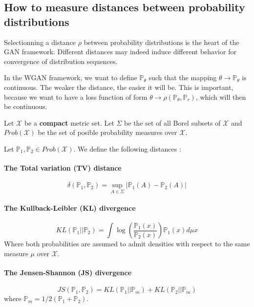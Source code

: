 \documentclass[a4paper]{article}
\newcommand{\X}{\mathcal{X}}
\newcommand{\Prob}{\mathbb{P}}
\theoremstyle{plain}
\theoremstyle{remark}
\theoremstyle{definition}
\begin{document}
\subsection{How to measure distances between probability distributions}

Selectionning a distance $\rho$ between probability distributions is the heart of the GAN framework. Different distances may indeed induce different behavior for convergence of distribution sequences.

In the WGAN framework, we want to define $\Prob_\theta$ such that the mapping $\theta \rightarrow \Prob_\theta$ is continuous. The weaker the distance, the easier it will be. This is important, because we want to have a loss function of form $\theta \rightarrow \rho(\Prob_\theta, \Prob_r)$, which will then be continuous.

Let $\X$ be a \textbf{compact} metric set. Let $\Sigma$ be the set of all Borel subsets of $\X$ and $Prob(\X)$ be the set of posible probability measures over $\X$.

Let $\Prob_1 , \Prob_2 \in Prob(\X)$. We define the following distances :

\paragraph{The Total variation (TV) distance}
\begin{equation}
\label{eq:TV}
\delta(\Prob_1,\Prob_2) = \sup_{A \in \Sigma} |\Prob_1(A) - \Prob_2(A)|
\end{equation}

\paragraph{The Kullback-Leibler (KL) divergence}
\begin{equation}
\label{eq:KL}
KL(\Prob_1 || \Prob_2) = \int{ \log \left( \frac{\Prob_1(x)}{\Prob_2(x)} \right) \Prob_1(x) d\mu x}
\end{equation}
Where both probabilities are assumed to admit densities with respect to the same measure $\mu$ over $\X$.

\paragraph{The Jensen-Shannon (JS) divergence}
\begin{equation}
\label{eq:JS}
JS(\Prob_1 , \Prob_2) = KL(\Prob_1 || \Prob_m) + KL(\Prob_2 || \Prob_m)
\end{equation}
where $\Prob_m = 1/2 (\Prob_1 + \Prob_2)$.
\end{document}
